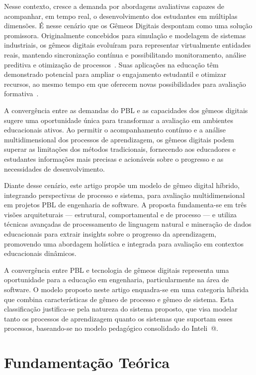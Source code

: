 \documentclass[english, spanish, brazilian]{modelo_dt}
\begin{document}
Nesse contexto, cresce a demanda por abordagens avaliativas capazes de acompanhar, em tempo real, o desenvolvimento dos estudantes em múltiplas dimensões. É nesse cenário que os Gêmeos Digitais despontam como uma solução promissora. Originalmente concebidos para simulação e modelagem de sistemas industriais, os gêmeos digitais evoluíram para representar virtualmente entidades reais, mantendo sincronização contínua e possibilitando monitoramento, análise preditiva e otimização de processos~\parencite{grieves2014digital, tao2018digital, barricelli2019systematic}. Suas aplicações na educação têm demonstrado potencial para ampliar o engajamento estudantil e otimizar recursos, ao mesmo tempo em que oferecem novas possibilidades para avaliação formativa~\parencite{zacher2020digital}.

A convergência entre as demandas do PBL e as capacidades dos gêmeos digitais sugere uma oportunidade única para transformar a avaliação em ambientes educacionais ativos. Ao permitir o acompanhamento contínuo e a análise multidimensional dos processos de aprendizagem, os gêmeos digitais podem superar as limitações dos métodos tradicionais, fornecendo aos educadores e estudantes informações mais precisas e acionáveis sobre o progresso e as necessidades de desenvolvimento.

Diante desse cenário, este artigo propõe um modelo de gêmeo digital híbrido, integrando perspectivas de processo e sistema, para avaliação multidimensional em projetos PBL de engenharia de software. A proposta fundamenta-se em três visões arquiteturais — estrutural, comportamental e de processo — e utiliza técnicas avançadas de processamento de linguagem natural e mineração de dados educacionais para extrair insights sobre o progresso da aprendizagem, promovendo uma abordagem holística e integrada para avaliação em contextos educacionais dinâmicos.

A convergência entre PBL e tecnologia de gêmeos digitais representa uma oportunidade para a educação em engenharia, particularmente na área de software\@. O modelo proposto neste artigo enquadra-se em uma categoria híbrida que combina características de gêmeo de processo e gêmeo de sistema\@. Esta classificação justifica-se pela natureza do sistema proposto, que visa modelar tanto os processos de aprendizagem quanto os sistemas que suportam esses processos, baseando-se no modelo pedagógico consolidado do Inteli~\parencite{valente2025ensino}@.

\section{Fundamentação Teórica}
\end{document}
